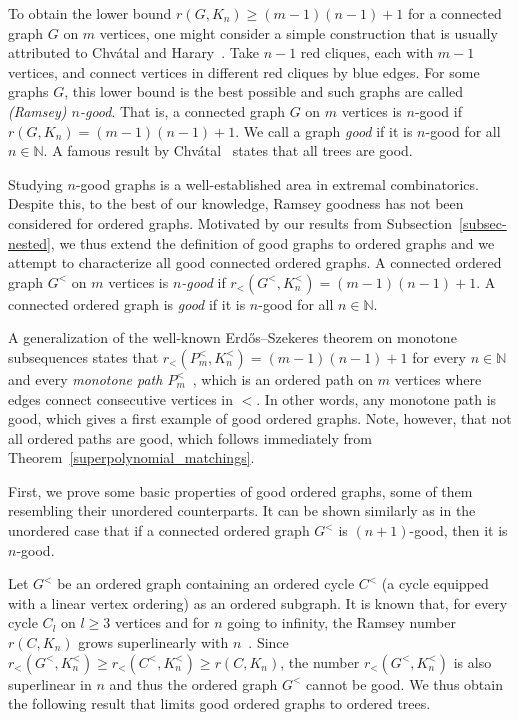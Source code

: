 \documentclass[11pt,a4paper]{article}
\theoremstyle{remark}
\begin{document}
To obtain the lower bound $r(G,K_n) \geq (m-1)(n-1)+1$ for a connected graph $G$ on $m$ vertices, one might consider a simple construction that is usually attributed to Chv\'{a}tal and Harary~\cite{chvaHa72}.
Take $n-1$ red cliques, each with $m-1$ vertices, and connect vertices in different red cliques by blue edges. 
For some graphs $G$, this lower bound is the best possible and such graphs are called \emph{(Ramsey) $n$-good}.
That is, a connected graph $G$ on $m$ vertices is $n$-good if $r(G,K_n)=(m-1)(n-1)+1$. We call a graph \emph{good} if it is $n$-good for all $n\in\mathbb{N}$.
A famous result by Chvátal~\cite{good_stromy} states that all trees are good.

Studying $n$-good graphs is a well-established area in extremal combinatorics. 
Despite this, to the best of our knowledge, Ramsey goodness has not been considered for ordered graphs. 
Motivated by our results from Subsection~\ref{subsec-nested}, we thus extend the definition of good graphs to ordered graphs and we attempt to characterize all good connected ordered graphs.
A connected ordered graph $G^<$ on $m$ vertices is \emph{$n$-good} if $r_<(G^<,K^<_n)=(m-1)(n-1)+1$. A connected ordered graph is \emph{good} if it is $n$-good for all $n\in\mathbb{N}$.

A generalization of the well-known Erd\H{o}s--Szekeres theorem on monotone subsequences states that $r_<(P^<_m,K^<_n)=(m-1)(n-1)+1$ for every $n\in\mathbb{N}$ and every \emph{monotone path $P^<_m$}~\cite{choPo02}, which is an ordered path on $m$ vertices where edges connect consecutive vertices in $<$.
In other words, any monotone path is good, which gives a first example of good ordered graphs. 
Note, however, that not all ordered paths are good, which follows immediately from Theorem~\ref{superpolynomial_matchings}.


First, we prove some basic properties of good ordered graphs, some of them resembling their unordered counterparts. 
It can be shown similarly as in the unordered case that if a connected ordered graph $G^<$ is $(n+1)$-good, then it is $n$-good.

Let $G^<$ be an ordered graph containing an ordered cycle $C^<$ (a cycle equipped with a linear vertex ordering) as an ordered subgraph.
It is known that, for every cycle $C_l$ on $l \geq 3$ vertices and for $n$ going to infinity, the Ramsey number $r(C,K_n)$ grows superlinearly with $n$~\cite{neusp_cykly_odhad,odhadtrojuhelnik2}.
Since $r_<(G^<,K^<_n)\geq r_<(C^<,K^<_n) \geq r(C,K_n)$, the number $r_<(G^<,K^<_n)$ is also superlinear in $n$ and thus the ordered graph $G^<$ cannot be good.
We thus obtain the following result that limits good ordered graphs to ordered trees.
\end{document}
